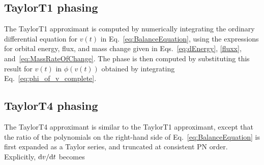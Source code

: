 \subsection{TaylorT1 phasing}
The TaylorT1 approximant is computed by numerically integrating the
ordinary differential equation for $v(t)$ in
Eq.~\eqref{eq:BalanceEquation}, using the expressions for orbital
energy, flux, and mass change given in Eqs.~\eqref{eq:dEnergy},
\eqref{fluxx}, and~\eqref{eq:MassRateOfChange}.  The phase is then
computed by substituting this result for $v(t)$ in $\phi(v(t))$ 
obtained by integrating Eq.~\eqref{eq:phi_of_v_complete}.


\subsection{TaylorT4 phasing}
The TaylorT4 approximant is similar to the TaylorT1 approximant,
except that the ratio of the polynomials on the right-hand side of
Eq.~\eqref{eq:BalanceEquation} is first expanded as a Taylor series,
and truncated at consistent PN order.  Explicitly, $\mathrm{d} v/\mathrm{d} t$ becomes
